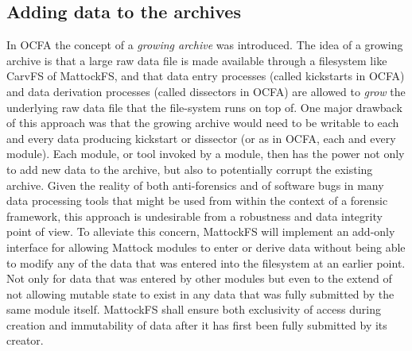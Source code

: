 \subsection{Adding data to the archives}
In OCFA the concept of a \emph{growing archive} was introduced. The idea of a growing archive is that a large raw data file is made available through a filesystem like CarvFS of MattockFS, and that data entry processes (called kickstarts in OCFA) and data derivation processes (called dissectors in OCFA) are allowed to \emph{grow} the underlying raw data file that the file-system runs on top of. One major drawback of this approach was that the growing archive would need to be writable to each and every data producing kickstart or dissector (or as in OCFA, each and every module). Each module, or tool invoked by a module, then has the power not only to add new data to the archive, but also to potentially corrupt the existing archive. Given the reality of both anti-forensics and of software bugs in many data processing tools that might be used from within the context of a forensic framework, this approach is undesirable from a robustness and data integrity point of view. To alleviate this concern, MattockFS will implement an add-only interface for allowing Mattock modules to enter or derive data without being able to modify any of the data that was entered into the filesystem at an earlier point. Not only for data that was entered by other modules but even to the extend of not allowing mutable state to exist in any data that was fully submitted by the same module itself. MattockFS shall ensure both exclusivity of access during creation and immutability of data after it has first been fully submitted by its creator.
